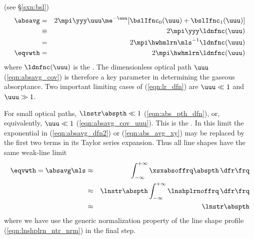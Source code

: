 \documentclass[12pt]{article}
\begin{document}
(see \S\ref{sxn:bsl}) 
\begin{eqnarray}
\absavg & = & 2 \mpi \yyy \uuu \me^{-\uuu} [ \bslIfnc_{0}(\uuu) + \bslIfnc_{1}(\uuu) ]
\nonumber \\
& \equiv & 2 \mpi \yyy \ldnfnc(\uuu) \nonumber \\
& = & 2 \mpi \hwhmlrn \mls^{-1} \ldnfnc(\uuu) \nonumber \\
\eqvwth & = & 2 \mpi \hwhmlrn \ldnfnc(\uuu)
\label{eqn:lr_dfn}
\end{eqnarray}
where $\ldnfnc(\uuu)$ is the 
\cite[]{LaR13}.
The dimensionless optical path $\uuu$ (\ref{eqn:absavg_cov}) is
therefore a key parameter in determining the gaseous absorptance.
Two important limiting cases of (\ref{eqn:lr_dfn}) are $\uuu \ll 1$
and $\uuu \gg 1$.

For small optical paths, $\lnstr \abspth \ll 1$
(\ref{eqn:abs_pth_dfn}), or, equivalently, $\uuu \ll 1$
(\ref{eqn:absavg_cov_uuu}).  
This is the .
In this limit the exponential in (\ref{eqn:absavg_dfn2}) or
(\ref{eqn:abs_avg_xy}) may be replaced by the first two terms in its
Taylor series expansion.   
Thus all line shapes have the same weak-line limit
\begin{eqnarray}
\eqvwth = \absavg \mls & \approx & \int_{-\infty}^{+\infty}
\xsxabsoffrq \abspth \,\dfr\frq
\nonumber \\
& \approx & \lnstr \abspth
\int_{-\infty}^{+\infty} \lnshplrnoffrq \,\dfr\frq
\nonumber \\
& \approx & \lnstr \abspth
\label{eqn:abs_avg_wll}
\end{eqnarray}
where we have use the generic normalization property of the line shape
profile (\ref{eqn:lnshplrn_ntr_nrm}) in the final step.
\end{document}
